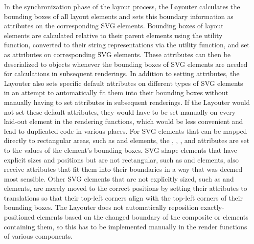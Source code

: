 In the synchronization phase of the layout process, the Layouter calculates the bounding boxes of all layout elements and sets this boundary information as attributes on the corresponding SVG elements.
Bounding boxes of layout elements are calculated relative to their parent elements using the  utility function, converted to their string representations via the  utility function, and set as  attributes on corresponding SVG elements.
These  attributes can then be deserialized to  objects whenever the bounding boxes of SVG elements are needed for calculations in subsequent renderings. 
In addition to setting  attributes, the Layouter also sets specific default attributes on different types of SVG elements in an attempt to automatically fit them into their bounding boxes without manually having to set attributes in subsequent renderings.
If the Layouter would not set these default attributes, they would have to be set manually on every laid-out element in the rendering functions, which would be less convenient and lead to duplicated code in various places.
For SVG elements that can be mapped directly to rectangular areas, such as  and  elements, the , , , and  attributes are set to the values of the element's bounding boxes.
SVG shape elements that have explicit sizes and positions but are not rectangular, such as  and  elements, also receive attributes that fit them into their boundaries in a way that was deemed most sensible. 
Other SVG elements that are not explicitly sized, such as  and  elements, are merely moved to the correct positions by setting their  attributes to translations so that their top-left corners align with the top-left corners of their bounding boxes. 
The Layouter does not automatically reposition exactly-positioned elements based on the changed boundary of the composite  or  elements containing them, so this has to be implemented manually in the render functions of various components.

